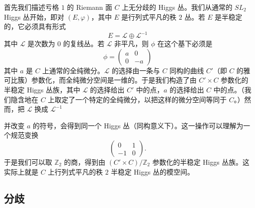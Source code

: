 \documentclass[11pt,a4paper]{article}
\begin{document}
首先我们描述亏格 $1$ 的 Riemann 面 $C$ 上无分歧的 Higgs 丛。我们从通常的 $SL_2$ Higgs 丛开始，即对 $(E,\varphi)$，其中 $E$ 是行列式平凡的秩 $2$ 丛。若 $E$ 是半稳定的，它必须具有形式
\begin{equation}\tag{3.1}
E=\mathcal{L}\oplus\mathcal{L}^{-1}
\end{equation}
其中 $\mathcal{L}$ 是次数为 $0$ 的复线丛。若 $\mathcal{L}$ 非平凡，则 $\phi$ 在这个基下必须是
\begin{equation}\tag{3.2}
\phi=
\begin{pmatrix}
a & 0\\
0 & -a
\end{pmatrix}
\end{equation}
其中 $a$ 是 $C$ 上通常的全纯微分。$\mathcal{L}$ 的选择由一条与 $C$ 同构的曲线 $C'$（即 $C$ 的雅可比簇）参数化，而全纯微分空间是一维的。于是我们构造了由 $C'\times C$ 参数化的半稳定 Higgs 丛族，其中 $\mathcal{L}$ 的选择给出 $C'$ 中的点，$a$ 的选择给出 $C$ 中的点。（我们隐含地在 $C$ 上取定了一个特定的全纯微分，以把这样的微分空间等同于 $C$。）然而，把 $\mathcal{L}$ 换成 $\mathcal{L}^{-1}$


并改变 $a$ 的符号，会得到同一个 Higgs 丛（同构意义下）。这一操作可以理解为一个规范变换
\begin{equation}\tag{3.3}
\begin{pmatrix}
0 & 1\\
-1 & 0
\end{pmatrix}.
\end{equation}
于是我们可以取 $\mathbb{Z}_2$ 的商，得到由 $(C'\times C)/\mathbb{Z}_2$ 参数化的半稳定 Higgs 丛族。这实际上就是 $C$ 上行列式平凡的秩 $2$ 半稳定 Higgs 丛的模空间。

\subsection{分歧}
\end{document}
